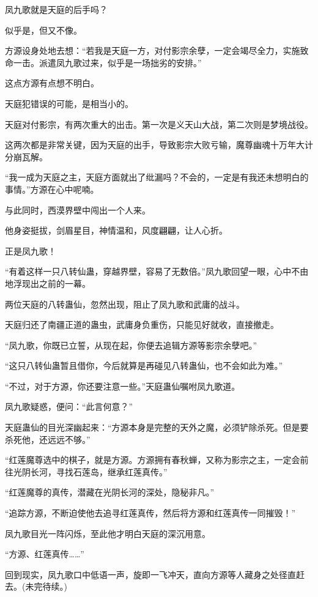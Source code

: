 \begin{this_body}
凤九歌就是天庭的后手吗？

似乎是，但又不像。

方源设身处地去想：“若我是天庭一方，对付影宗余孽，一定会竭尽全力，实施致命一击。派遣凤九歌过来，似乎是一场拙劣的安排。”

这点方源有点想不明白。

天庭犯错误的可能，是相当小的。

天庭对付影宗，有两次重大的出击。第一次是义天山大战，第二次则是梦境战役。

这两次都是非常关键，因为天庭的出手，导致影宗大败亏输，魔尊幽魂十万年大计分崩瓦解。

“我一成为天庭之主，天庭方面就出了纰漏吗？不会的，一定是有我还未想明白的事情。”方源在心中呢喃。

与此同时，西漠界壁中闯出一个人来。

他身姿挺拔，剑眉星目，神情温和，风度翩翩，让人心折。

正是凤九歌！

“有着这样一只八转仙蛊，穿越界壁，容易了无数倍。”凤九歌回望一眼，心中不由地浮现出之前的一幕。

两位天庭的八转蛊仙，忽然出现，阻止了凤九歌和武庸的战斗。

天庭归还了南疆正道的蛊虫，武庸身负重伤，只能见好就收，直接撤走。

“凤九歌，你既已立誓，从现在起，你便去追辑方源等影宗余孽吧。”

“这只八转仙蛊暂且借你，今后就算是再碰见八转蛊仙，也不会如此为难。”

“不过，对于方源，你还要注意一些。”天庭蛊仙嘱咐凤九歌道。

凤九歌疑惑，便问：“此言何意？”

天庭蛊仙的目光深幽起来：“方源本身是完整的天外之魔，必须铲除杀死。但是要杀死他，还远远不够。”

“红莲魔尊选中的棋子，就是方源。方源拥有春秋蝉，又称为影宗之主，一定会前往光阴长河，寻找石莲岛，继承红莲真传。”

“红莲魔尊的真传，潜藏在光阴长河的深处，隐秘非凡。”

“追踪方源，不断迫使他去追寻红莲真传，然后将方源和红莲真传一同摧毁！”

凤九歌目光一阵闪烁，至此他才明白天庭的深沉用意。

“方源、红莲真传……”

回到现实，凤九歌口中低语一声，旋即一飞冲天，直向方源等人藏身之处径直赶去。(未完待续。)

\end{this_body}

